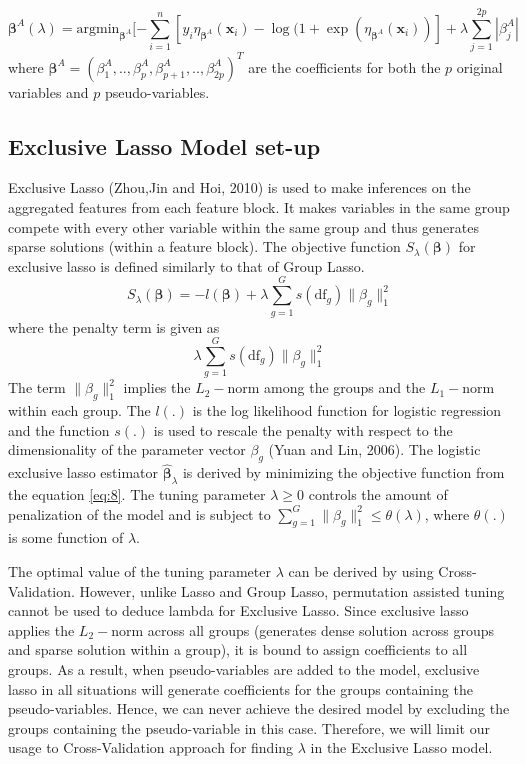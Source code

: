 \begin{equation}\label{eq:7}
\pmb{\beta}^A(\lambda) = \text{argmin}_{\pmb{\beta}^A}[-\sum_{i=1}^{n}[y_i\eta_{\pmb{\beta}^A}(\mathbf{x}_i)-\log(1+\exp(\eta_{\pmb{\beta}^A}(\mathbf{x}_i))]+\lambda\sum_{j=1}^{2p} |\beta_j^A|
\end{equation}
where $\pmb{\beta}^A = (\beta^A_1,..,\beta^A_p,\beta^A_{p+1},.., \beta^A_{2p})^T$ are the coefficients for both the $p$ original variables and $p$ pseudo-variables.\par
\subsection{Exclusive Lasso Model set-up}\label{subsec:exclusivelasso}
Exclusive Lasso (\cite{exclusv_lasso}Zhou,Jin and Hoi, 2010) is used to make inferences on the aggregated features from each feature block. It makes variables in the same group compete with every other variable within the same group and thus generates sparse solutions (within a feature block). The objective function $S_{\lambda}(\pmb\beta)$ for exclusive lasso is defined similarly to that of Group Lasso.
\begin{equation}\label{eq:8}
S_{\lambda}(\pmb\beta) = -l(\pmb\beta)+\lambda\sum_{g=1}^{G}s(\text{df}_g)\|\beta_g\|_1^2
\end{equation}
where the penalty term is given as 
\begin{equation}\label{eq:exclusvpenalty}
\lambda\sum_{g=1}^{G}s(\text{df}_g)\|\beta_g\|_1^2
\end{equation}
The term $\|\beta_g\|_1^2$ implies the $L_2-$norm among the groups and the $L_1-$norm within each group. The $l(.)$ is the log likelihood function for logistic regression and the function $s(.)$ is used to rescale the penalty with respect to the dimensionality of the parameter vector $\beta_g$ (\cite{grouporigin}Yuan and Lin, 2006). The logistic exclusive lasso estimator $\pmb{\hat\beta}_{\lambda}$ is derived by minimizing the objective function from the equation \eqref{eq:8}. The tuning parameter $\lambda\ge 0$ controls the amount of penalization of the model and is subject to $\sum_{g=1}^{G}\|\beta_g\|^{2}_{1}\le \theta(\lambda)$, where $\theta(.)$ is some function of $\lambda$.\par
The optimal value of the tuning parameter $\lambda$ can be derived by using Cross-Validation. However, unlike Lasso and Group Lasso, permutation assisted tuning cannot be used to deduce lambda for Exclusive Lasso. Since exclusive lasso applies the $L_2-$norm across all groups (generates dense solution across groups and sparse solution within a group), it is bound to assign coefficients to all groups. As a result, when pseudo-variables are added to the model, exclusive lasso in all situations will generate coefficients for the groups containing the pseudo-variables. Hence, we can never achieve the desired model by excluding the groups containing the pseudo-variable in this case. Therefore, we will limit our usage to Cross-Validation approach for finding $\lambda$ in the Exclusive Lasso model.\par






